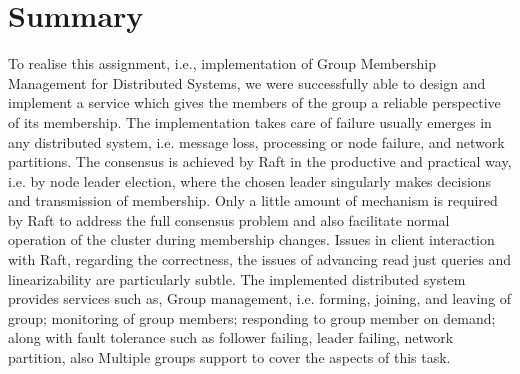 \documentclass[a4paper,11pt]{article}
\begin{document}
\section{Summary}
To realise this assignment, i.e., implementation of Group Membership Management for Distributed Systems, we were successfully able to design and implement a service which gives the members of the group a reliable perspective of its membership. The implementation takes care of failure usually emerges in any distributed system, i.e. message loss, processing or node failure, and network partitions. The consensus is achieved by Raft in the productive and practical way, i.e. by node leader election, where the chosen leader singularly makes decisions and transmission of membership. Only a little amount of mechanism is required by Raft to address the full consensus problem and also facilitate normal operation of the cluster during membership changes. Issues in client interaction with Raft, regarding the correctness, the issues of advancing read just queries and linearizability are particularly subtle. 
The implemented distributed system provides services such as, Group management, i.e. forming, joining, and leaving of group; monitoring of group members; responding to group member on demand; along with fault tolerance such as follower failing, leader failing, network partition, also Multiple groups support to cover the aspects of this task.


\end{document}
